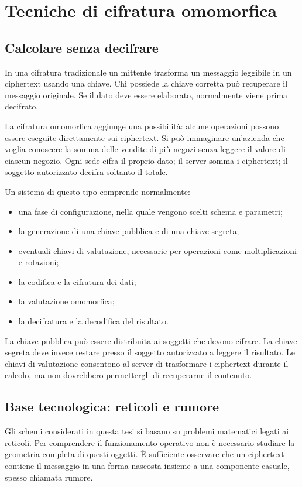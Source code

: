 \chapter{Tecniche di cifratura omomorfica}

\section{Calcolare senza decifrare}
In una cifratura tradizionale un mittente trasforma un messaggio leggibile in un ciphertext usando una chiave. Chi possiede la chiave corretta pu\`o recuperare il messaggio originale. Se il dato deve essere elaborato, normalmente viene prima decifrato.

La cifratura omomorfica aggiunge una possibilit\`a: alcune operazioni possono essere eseguite direttamente sui ciphertext. Si pu\`o immaginare un'azienda che voglia conoscere la somma delle vendite di pi\`u negozi senza leggere il valore di ciascun negozio. Ogni sede cifra il proprio dato; il server somma i ciphertext; il soggetto autorizzato decifra soltanto il totale.

Un sistema di questo tipo comprende normalmente:
\begin{itemize}
  \item una fase di configurazione, nella quale vengono scelti schema e parametri;
  \item la generazione di una chiave pubblica e di una chiave segreta;
  \item eventuali chiavi di valutazione, necessarie per operazioni come moltiplicazioni e rotazioni;
  \item la codifica e la cifratura dei dati;
  \item la valutazione omomorfica;
  \item la decifratura e la decodifica del risultato.
\end{itemize}

La chiave pubblica pu\`o essere distribuita ai soggetti che devono cifrare. La chiave segreta deve invece restare presso il soggetto autorizzato a leggere il risultato. Le chiavi di valutazione consentono al server di trasformare i ciphertext durante il calcolo, ma non dovrebbero permettergli di recuperarne il contenuto.

\section{Base tecnologica: reticoli e rumore}
Gli schemi considerati in questa tesi si basano su problemi matematici legati ai reticoli. Per comprendere il funzionamento operativo non \`e necessario studiare la geometria completa di questi oggetti. \`E sufficiente osservare che un ciphertext contiene il messaggio in una forma nascosta insieme a una componente casuale, spesso chiamata rumore.

